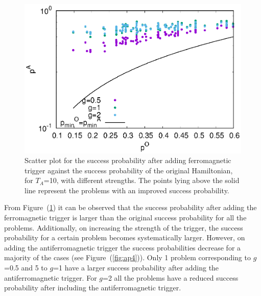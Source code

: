 \documentclass[../main.tex]{subfiles}
\begin{document}
\begin{appendices}
\begin{figure}[H]
\centering 
\includegraphics[scale=0.8]{Succ_OF_8.eps}
\caption{Scatter plot for the success probability after adding ferromagnetic trigger against the success probability of the original Hamiltonian, for $T_A$=10, with different strengths. The points lying above the solid line represent the problems with an improved success probability.}
\label{fig:ap3}
\end{figure}
From Figure~(\ref{fig:ap3}) it can be observed that the success probability after adding the ferromagnetic trigger is larger than the original success probability for all the problems. Additionally, on increasing the strength of the trigger, the success probability for a certain problem becomes systematically larger. However, on adding the antiferromagnetic trigger the success probabilities decrease for a majority of the cases (see Figure~(\ref{fig:ap4})). Only 1 problem corresponding to $g$=0.5 and 5 to $g$=1 have a larger success probability after adding the antiferromagnetic trigger. For $g$=2 all the problems have a reduced success probability after including the antiferromagnetic trigger.



\end{appendices}
\end{document}
